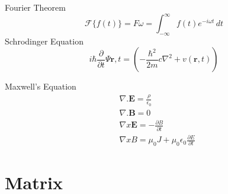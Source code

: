 \documentclass{report}
\begin{document}
\noindent Fourier Theorem
\[
\mathcal{F}\{f(t)\}=F{\omega}=\int_{-\infty}^{\infty} f(t) e^{-i \omega t}\,dt
\]
Schrodinger Equation
\[
i \hbar \frac{\partial}{\partial t} \Psi{\mathbf{r},t}= \left (-\frac{\hbar^2}{2m}c \nabla^2 + v(\mathbf{r},t) \right) 
\]

Maxwell's Equation
\begin{align*}   
& \nabla . \textbf{E} = \frac{\rho}{\epsilon_0}  \\
& \nabla . \textbf{B} = 0 \\
& \nabla x \textbf{E}= -\frac{\partial B}{\partial t} \\
& \nabla x B = \mu_0 J + \mu_0 \epsilon_0 \frac{\partial E}{\partial t} 
\end{align*}


\section{Matrix}
\end{document}
